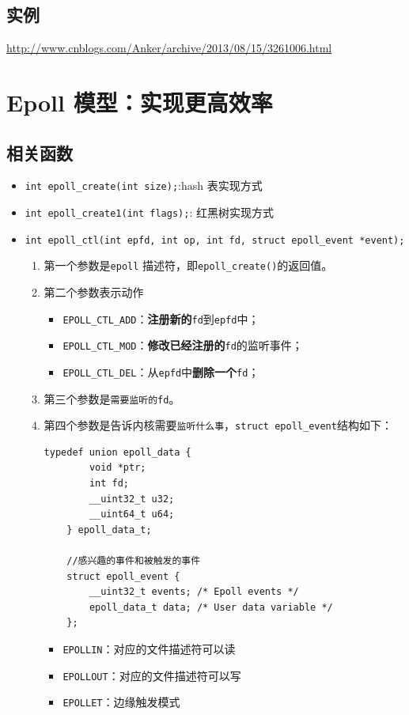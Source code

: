\documentclass[UTF8,a4paper,8pt]{ctexbook}
\begin{document}
		\subsection{实例}
		
		\url{http://www.cnblogs.com/Anker/archive/2013/08/15/3261006.html}
	\section{Epoll 模型：实现更高效率}
		\subsection{相关函数}
			\begin{itemize}
				\item \verb|int epoll_create(int size);|:hash 表实现方式
				\item \verb|int epoll_create1(int flags);|: 红黑树实现方式
				\item \verb|int epoll_ctl(int epfd, int op, int fd, struct epoll_event *event);|
					\begin{enumerate}[itemindent = 1em]
						\item 第一个参数是\verb|epoll| 描述符，即\verb|epoll_create()|的返回值。
						\item 第二个参数表示动作
							\begin{itemize}
								\item \verb|EPOLL_CTL_ADD|：\textbf{注册新的}\verb|fd|到\verb|epfd|中；
								\item \verb|EPOLL_CTL_MOD|：\textbf{修改已经注册的}\verb|fd|的监听事件；
								\item \verb|EPOLL_CTL_DEL|：从\verb|epfd|中\textbf{删除一个}\verb|fd|；
							\end{itemize}
						\item 第三个参数是\verb|需要监听的fd|。
						\item 第四个参数是告诉内核需要\verb|监听什么事|，\verb|struct epoll_event|结构如下：
							\begin{lstlisting}[frame=L]
	typedef union epoll_data {  
		void *ptr;  
		int fd;  
		__uint32_t u32;  
		__uint64_t u64;  
	} epoll_data_t;  
	
	//感兴趣的事件和被触发的事件  
	struct epoll_event {  
		__uint32_t events; /* Epoll events */  
		epoll_data_t data; /* User data variable */  
	};  
							\end{lstlisting}
							
							\begin{itemize}
								\item \verb|EPOLLIN|：对应的文件描述符可以读
								\item \verb|EPOLLOUT|：对应的文件描述符可以写
								\item \verb|EPOLLET|：边缘触发模式
							\end{itemize}
							

\end{enumerate}
\end{itemize}
\end{document}
